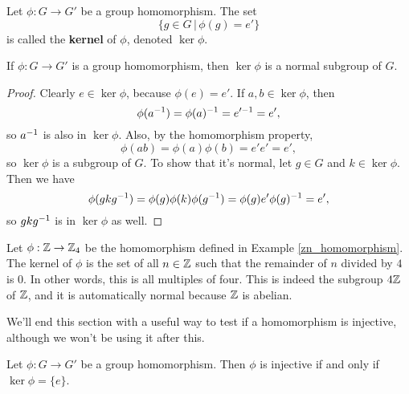 \begin{definition}
Let $\phi: G \to G'$ be a group homomorphism. The set
\begin{equation*}
    \{g \in G \,|\, \phi(g) = e'\}
\end{equation*}
is called the \textbf{kernel} of $\phi$, denoted $\ker \phi$.
\end{definition}

\begin{theorem}
\label{normalkernel}
If $\phi: G \to G'$ is a group homomorphism, then $\ker\phi$ is a normal subgroup of $G$.
\end{theorem}

\begin{proof}
Clearly $e \in \ker\phi$, because $\phi(e) = e'$. If $a, b \in \ker\phi$, then
\begin{equation*}
    \phi(\inv a) = \inv{\phi(a)} = \inv{e'} = e',
\end{equation*}
so $\inv a$ is also in $\ker\phi$. Also, by the homomorphism property,
\begin{equation*}
    \phi(ab) = \phi(a)\phi(b) = e'e' = e',
\end{equation*}
so $\ker\phi$ is a subgroup of $G$. To show that it's normal, let $g \in G$ and $k \in \ker\phi$. Then we have
\begin{equation*}
    \phi(gk\inv g) = \phi(g)\phi(k)\phi(\inv g) = \phi(g) e' \inv{\phi(g)} = e',
\end{equation*}
so $gk\inv g$ is in $\ker\phi$ as well.

\end{proof}

\begin{example}
Let $\phi: \z \to \zn[4]$ be the homomorphism defined in Example \ref{zn_homomorphism}. The kernel of $\phi$ is the set of all $n \in \z$ such that the remainder of $n$ divided by $4$ is $0$. In other words, this is all multiples of four. This is indeed the subgroup $4\z$ of $\z$, and it is automatically normal because $\z$ is abelian.
\end{example}

We'll end this section with a useful way to test if a homomorphism is injective, although we won't be using it after this.

\begin{theorem}
Let \extra $\phi: G \to G'$ be a group homomorphism. Then $\phi$ is injective if and only if $\ker \phi = \{e\}$.
\end{theorem}

